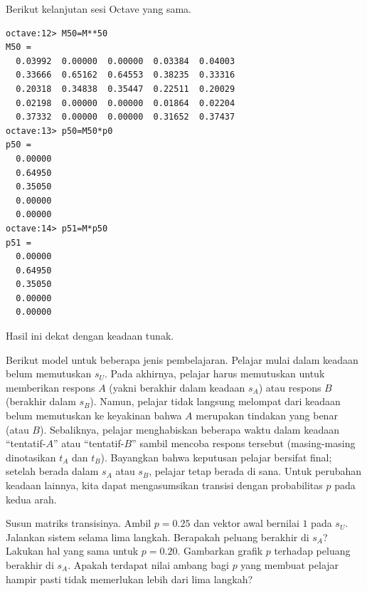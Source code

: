 \begin{exercises}
\begin{answer}
\begin{exparts}
\begin{center}
\begin{tabular}{c|cccc}
           \end{tabular}
       \end{center} 
        \partsitem Berikut kelanjutan sesi Octave yang sama.
\par\noindent\begin{minipage}{\linewidth}
\begin{lstlisting}
octave:12> M50=M**50
M50 =
  0.03992  0.00000  0.00000  0.03384  0.04003
  0.33666  0.65162  0.64553  0.38235  0.33316
  0.20318  0.34838  0.35447  0.22511  0.20029
  0.02198  0.00000  0.00000  0.01864  0.02204
  0.37332  0.00000  0.00000  0.31652  0.37437
octave:13> p50=M50*p0
p50 =
  0.00000
  0.64950
  0.35050
  0.00000
  0.00000
octave:14> p51=M*p50
p51 =
  0.00000
  0.64950
  0.35050
  0.00000
  0.00000
\end{lstlisting}
\end{minipage}\par
        Hasil ini dekat dengan keadaan tunak.
      \end{exparts}
    \end{answer}
  \item 
    \cite{Wickens} %
    Berikut model untuk beberapa jenis pembelajaran.
    Pelajar mulai dalam keadaan belum memutuskan $s_U$.
    Pada akhirnya, pelajar harus memutuskan untuk memberikan respons $A$
    (yakni berakhir dalam keadaan $s_A$) atau respons $B$ (berakhir dalam
    $s_B$). Namun, pelajar tidak langsung melompat dari keadaan belum
    memutuskan ke keyakinan bahwa $A$ merupakan tindakan yang benar (atau $B$).
    Sebaliknya, pelajar menghabiskan beberapa waktu dalam keadaan
    ``tentatif-$A$'' atau ``tentatif-$B$'' sambil mencoba respons tersebut
    (masing-masing dinotasikan $t_A$ dan $t_B$).
    Bayangkan bahwa keputusan pelajar bersifat final; setelah berada dalam
    $s_A$ atau $s_B$, pelajar tetap berada di sana.
    Untuk perubahan keadaan lainnya, kita dapat mengasumsikan transisi dengan
    probabilitas $p$ pada kedua arah.
    \begin{exparts}
      \partsitem Susun matriks transisinya.
      \partsitem Ambil $p=0.25$ dan vektor awal bernilai $1$ pada $s_U$.
        Jalankan sistem selama lima langkah.
        Berapakah peluang berakhir di $s_A$?
      \partsitem Lakukan hal yang sama untuk $p=0.20$.
      \partsitem Gambarkan grafik $p$ terhadap peluang berakhir di $s_A$.
        Apakah terdapat nilai ambang bagi $p$ yang membuat pelajar hampir pasti
        tidak memerlukan lebih dari lima langkah?
    \end{exparts}

\end{exercises}
